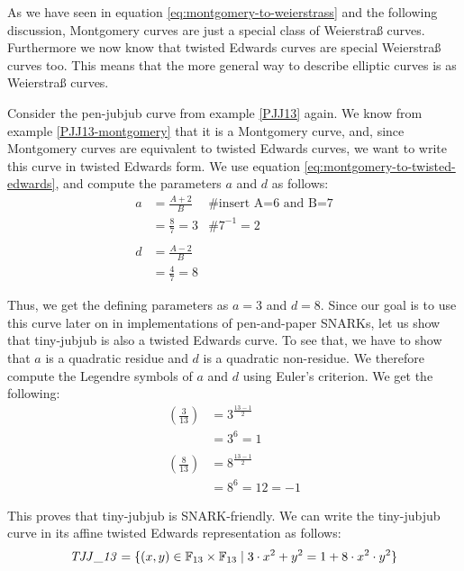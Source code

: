 As we have seen in equation \ref{eq:montgomery-to-weierstrass} and the following discussion,  Montgomery curves are just a special class of Weierstraß curves. Furthermore we now know that twisted Edwards curves are special Weierstraß curves too. This means that the more general way to describe elliptic curves is as Weierstraß curves.

\begin{example}Consider the pen-jubjub curve from example \ref{PJJ13} again. We know from example \ref{PJJ13-montgomery} that it is a Montgomery curve, and, since Montgomery curves are equivalent to twisted Edwards curves, we want to write this curve in twisted Edwards form. We use equation \ref{eq:montgomery-to-twisted-edwards}, and compute the parameters $a$ and $d$ as follows:
\begin{align*}
a & = \frac{A+2}{B} & \text{\# insert A=6 and B=7}\\
  & = \frac{8}{7} = 3 & \text{\# } 7^{-1}= 2 \\
  \\
d & = \frac{A-2}{B} \\
  & = \frac{4}{7} = 8 
\end{align*}

Thus, we get the defining parameters as $a= 3$ and $d=8$. Since our goal is to use this curve later on in implementations of pen-and-paper SNARKs, let us show that tiny-jubjub is also a  twisted Edwards curve. To see that, we  have to show that $a$ is a quadratic residue and $d$ is a quadratic non-residue. We therefore compute the Legendre symbols of $a$ and $d$ using Euler's criterion. We get the following:
\begin{align*}
\left(\frac{3}{13}\right) &= 3^{\frac{13-1}{2}} \\
                          & = 3^6 
                            = 1\\
                          \\
\left(\frac{8}{13}\right) &= 8^{\frac{13-1}{2}} \\
                          & = 8^6 
                            = 12
                            = -1                     
\end{align*}

This proves that tiny-jubjub is SNARK-friendly. We can write the tiny-jubjub curve in its affine twisted Edwards representation as follows:
\begin{equation}\label{PJJ13-twisted-edwards}
\mathit{TJJ\_13} = \{(x,y)\in \mathbb{F}_{13}\times \mathbb{F}_{13}\;|\; 3\cdot x^{2} + y^2 =1+ 8\cdot x^{2}\cdot y^2 \}
\end{equation}


\end{example}

